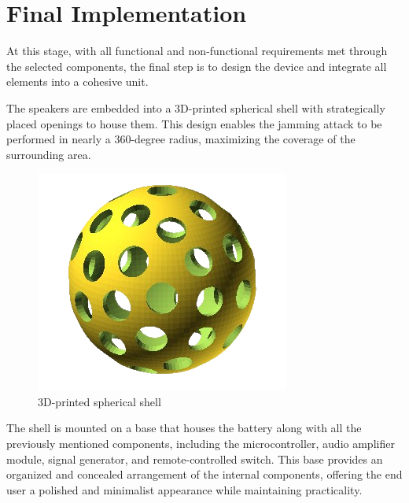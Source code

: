 \section{Final Implementation}
At this stage, with all functional and non-functional requirements met through the selected components, the final step is to design the device and integrate all elements into a cohesive unit.

The speakers are embedded into a 3D-printed spherical shell with strategically placed openings to house them. 
This design enables the jamming attack to be performed in nearly a 360-degree radius, maximizing the coverage of the surrounding area.
\begin{figure}[H]
    \centering
    \includegraphics[width=0.25\linewidth]{images/image-removebg-preview.png}
    \caption{3D-printed spherical shell}
\end{figure}
The shell is mounted on a base that houses the battery along with all the previously mentioned components, including the microcontroller, audio amplifier module, signal generator, and remote-controlled switch. 
This base provides an organized and concealed arrangement of the internal components, offering the end user a polished and minimalist appearance while maintaining practicality.
